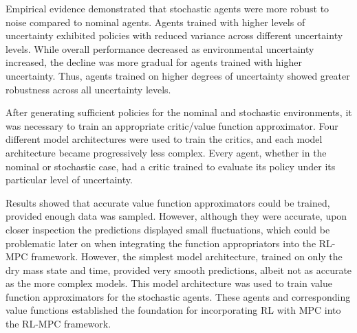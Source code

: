 Empirical evidence demonstrated that stochastic agents were more robust to noise compared to nominal agents. Agents trained with higher levels of uncertainty exhibited policies with reduced variance across different uncertainty levels. While overall performance decreased as environmental uncertainty increased, the decline was more gradual for agents trained with higher uncertainty. Thus, agents trained on higher degrees of uncertainty showed greater robustness across all uncertainty levels.

 After generating sufficient policies for the nominal and stochastic environments, it was necessary to train an appropriate critic/value function approximator. Four different model architectures were used to train the critics, and each model architecture became progressively less complex. Every agent, whether in the nominal or stochastic case, had a critic trained to evaluate its policy under its particular level of uncertainty. 
 
 Results showed that accurate value function approximators could be trained, provided enough data was sampled. However, although they were accurate, upon closer inspection the predictions displayed small fluctuations, which could be problematic later on when integrating the function appropriators into the RL-MPC framework. However, the simplest model architecture, trained on only the dry mass state and time, provided very smooth predictions, albeit not as accurate as the more complex models. This model architecture was used to train value function approximators for the stochastic agents. These agents and corresponding value functions established the foundation for incorporating RL with MPC into the RL-MPC framework.

